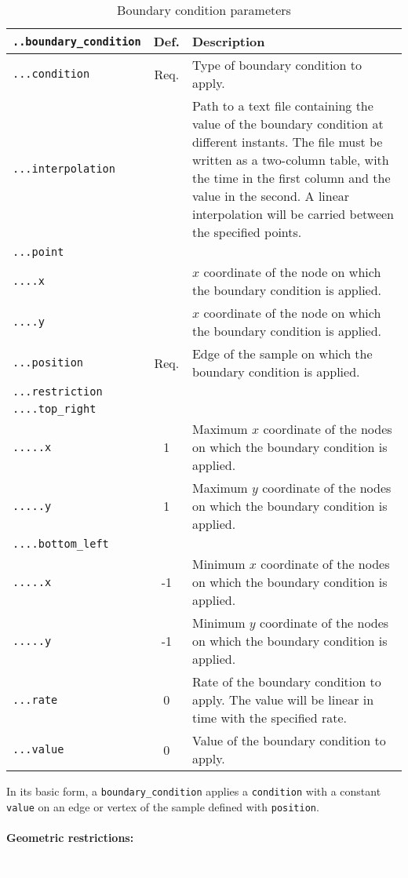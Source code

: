 \documentclass[10pt]{article}
\newcommand{\whiteline}{\textcolor{white}{.\\}}
\begin{document}
\begin{table}[h!]
\begin{tabularx}{\textwidth}{lcX}
\verb+..boundary_condition+ & Def. & Description\\
\hline
\verb+...condition+ & Req.  & Type of boundary condition to apply. \\	
\verb+...interpolation+ &  & Path to a text file containing the value of the boundary condition at different instants. The file must be written as a two-column table, with the time in the first column and the value in the second. A linear interpolation will be carried between the specified points. \\	
\verb+...point+ & & \\
\verb+....x+ & & $x$ coordinate of the node on which the boundary condition is applied.\\
\verb+....y+ & & $x$ coordinate of the node on which the boundary condition is applied.\\
\verb+...position+ & Req.  & Edge of the sample on which the boundary condition is applied. \\	
\verb+...restriction+ & & \\
\verb+....top_right+ & & \\
\verb+.....x+ & 1 & Maximum $x$ coordinate of the nodes on which the boundary condition is applied.\\
\verb+.....y+ & 1 & Maximum $y$ coordinate of the nodes on which the boundary condition is applied.\\
\verb+....bottom_left+ & & \\
\verb+.....x+ & -1 & Minimum $x$ coordinate of the nodes on which the boundary condition is applied.\\
\verb+.....y+ & -1 & Minimum $y$ coordinate of the nodes on which the boundary condition is applied.\\
\verb+...rate+ & 0  & Rate of the boundary condition to apply. The value will be linear in time with the specified rate. \\	
\verb+...value+ & 0  & Value of the boundary condition to apply. \\	
\hline
\end{tabularx}
\caption{Boundary condition parameters}
\end{table}

In its basic form, a \verb+boundary_condition+ applies a \verb+condition+ with a constant \verb+value+ on an edge or vertex of the sample defined with \verb+position+.

\paragraph{Geometric restrictions:} \whiteline
\end{document}
